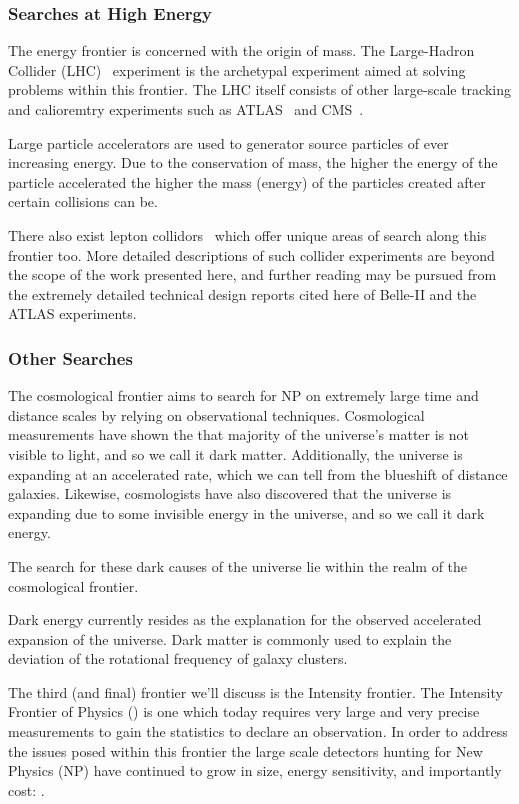 \subsubsection{Searches at High Energy}
The energy frontier is concerned with the origin of mass.
The Large-Hadron Collider (LHC)~\citep{higgs_discovery_20121} experiment is the archetypal experiment aimed at solving problems within this frontier.
The LHC itself consists of other large-scale tracking and calioremtry experiments such as ATLAS~\citep{ATLAS:1999vwa} and CMS~\citep{CMS:2006myw}.

Large particle accelerators are used to generator source particles of ever increasing energy.
Due to the conservation of mass, the higher the energy of the particle accelerated the higher the mass (energy) of the particles created after certain collisions can be.

There also exist lepton collidors~\citep{belle2_tdr_arxiv} which offer unique areas of search along this frontier too.
More detailed descriptions of such collider experiments are beyond the scope of the work presented here, and further reading may be pursued from the extremely detailed technical design reports cited here of Belle-II and the ATLAS experiments.

\subsubsection{Other Searches}
The cosmological frontier aims to search for NP on extremely large time and distance scales by relying on observational techniques.
Cosmological measurements have shown the that majority of the universe's matter is not visible to light, and so we call it dark matter.
Additionally, the universe is expanding at an accelerated rate, which we can tell from the blueshift of distance galaxies.
Likewise, cosmologists have also discovered that the universe is expanding due to some invisible energy in the universe, and so we call it dark energy.

The search for these dark causes of the universe lie within the realm of the cosmological frontier.

Dark energy currently resides as the explanation for the observed accelerated expansion of the universe.
Dark matter is commonly used to explain the deviation of the rotational frequency of galaxy clusters.

The third (and final) frontier we'll discuss is the Intensity frontier.
The Intensity Frontier of Physics (\citep{intensityfrontier2012_Hewett}) is one which today requires very large and very precise measurements to gain the statistics to declare an observation.
In order to address the issues posed within this frontier the large scale detectors hunting for New Physics (NP) have continued to grow in size, energy sensitivity, and importantly cost: \citep{Juno:2022103927}.

